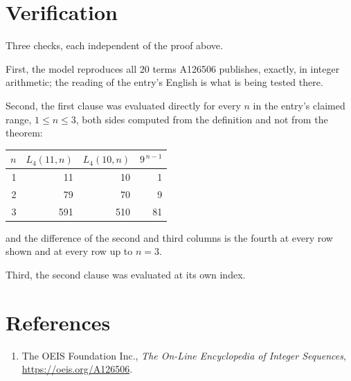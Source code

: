 \documentclass[11pt,a4paper]{article}
\theoremstyle{plain}
\theoremstyle{definition}
\begin{document}
\section{Verification}

Three checks, each independent of the proof above.

First, the model reproduces all $20$ terms A126506 publishes, exactly, in integer
arithmetic; the reading of the entry's English is what is being tested there.

Second, the first clause was evaluated directly for every $n$ in the entry's claimed range,
$1\le n\le3$, both sides computed from the definition and not from the theorem:

\begin{center}
\begin{tabular}{rrrr}
$n$ & $L_{4}(11,n)$ & $L_{4}(10,n)$ & $9^{\,n-1}$ \\ \hline
1 & 11 & 10 & 1 \\
2 & 79 & 70 & 9 \\
3 & 591 & 510 & 81 \\
\end{tabular}
\end{center}

\noindent and the difference of the second and third columns is the fourth at every row shown
and at every row up to $n=3$.

Third, the second clause was evaluated at its own index.

\section*{References}
\begin{enumerate}
\item The OEIS Foundation Inc., \emph{The On-Line Encyclopedia of Integer Sequences},
\url{https://oeis.org/A126506}.
\end{enumerate}
\end{document}
